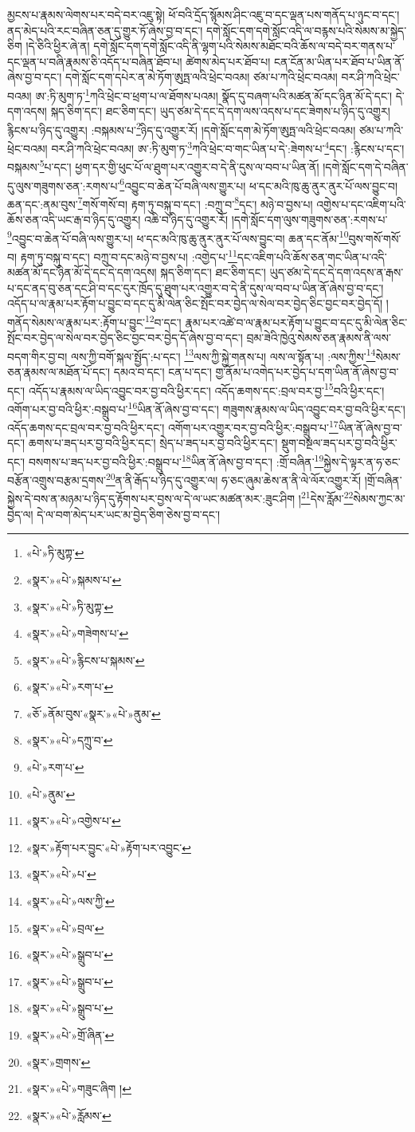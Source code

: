 མྱངས་པ་རྣམས་ལེགས་པར་བདེ་བར་འཇུ་སྟེ། ཕོ་བའི་དྲོད་སྙོམས་ཤིང་འཇུ་བ་དང་ལྡན་པས་གནོད་པ་ཉུང་བ་དང་། ནད་མེད་པའི་རང་བཞིན་ཅན་དུ་གྱུར་ཏོ་ཞེས་བྱ་བ་དང་། དགེ་སློང་དག་དགེ་སློང་འདི་ལ་བརྙས་པའི་སེམས་མ་སྐྱེད་ཅིག །དེ་ཅིའི་ཕྱིར་ཞེ་ན། དགེ་སློང་དག་དགེ་སློང་འདི་ནི་ལྷག་པའི་སེམས་མཐོང་བའི་ཆོས་ལ་བདེ་བར་གནས་པ་དང་ལྡན་པ་བཞི་རྣམས་ཅི་འདོད་པ་བཞིན་ཐོབ་པ། ཚེགས་མེད་པར་ཐོབ་པ། ངན་ངོན་མ་ཡིན་པར་ཐོབ་པ་ཡིན་ནོ་ཞེས་བྱ་བ་དང་། དགེ་སློང་དག་དཔེར་ན་མེ་ཏོག་ཨུཏྤ་ལའི་ཕྲེང་བའམ། ཙམ་པ་ཀའི་ཕྲེང་བའམ། བར་ཤི་ཀའི་ཕྲེང་བའམ། ཨ་:ཏི་མུག་ཏ་\footnote{«པེ་»ཏི་མུཀྟ་}ཀའི་ཕྲེང་བ་ཕྲག་པ་ལ་ཐོགས་པའམ། སྣོད་དུ་བཞག་པའི་མཚན་མོ་དང་ཉིན་མོ་དེ་དང་། དེ་དག་འདས། སྐད་ཅིག་དང་། ཐང་ཅིག་དང་། ཡུད་ཙམ་དེ་དང་དེ་དག་ལས་འདས་པ་དང་ཟེགས་པ་ཉིད་དུ་འགྱུར། རྙིངས་པ་ཉིད་དུ་འགྱུར། :བསྐམས་པ་\footnote{«སྣར་»«པེ་»སྐམས་པ་}ཉིད་དུ་འགྱུར་རོ། །དགེ་སློང་དག་མེ་ཏོག་ཨུཏྤ་ལའི་ཕྲེང་བའམ། ཙམ་པ་ཀའི་ཕྲེང་བའམ། བར་ཤི་ཀའི་ཕྲེང་བའམ། ཨ་:ཏི་མུག་ཏ་\footnote{«སྣར་»«པེ་»ཏི་མུཀྟ་}ཀའི་ཕྲེང་བ་གང་ཡིན་པ་དེ་:ཟེགས་པ་\footnote{«སྣར་»«པེ་»གཟེགས་པ་}དང་། :རྙིངས་པ་དང་། བསྐམས་\footnote{«སྣར་»«པེ་»རྙིངས་པ་སྐམས་}པ་དང་། ཕྱག་དར་གྱི་ཕུང་པོ་ལ་ཐུག་པར་འགྱུར་བ་དེ་ནི་དུས་ལ་བབ་པ་ཡིན་ནོ། །དགེ་སློང་དག་དེ་བཞིན་དུ་ལུས་གཟུགས་ཅན་:རགས་པ་\footnote{«སྣར་»«པེ་»རག་པ་}འབྱུང་བ་ཆེན་པོ་བཞི་ལས་གྱུར་པ། ཕ་དང་མའི་ཁུ་ཆུ་ནུར་ནུར་པོ་ལས་བྱུང་བ། ཆན་དང་:ནམ་བུས་\footnote{«ཅོ་»ནོམ་བུས་«སྣར་»«པེ་»ནུམ་}གསོ་གསོ་བ། རྟག་ཏུ་བསྐུ་བ་དང་། :བཀྲུ་བ་\footnote{«སྣར་»«པེ་»དཀྲུ་བ་}དང་། མཉེ་བ་བྱས་པ། འགྱེས་པ་དང་འཇིག་པའི་ཆོས་ཅན་འདི་ཡང་རྒ་བ་ཉིད་དུ་འགྱུར། འཆི་བ་ཉིད་དུ་འགྱུར་རོ། །དགེ་སློང་དག་ལུས་གཟུགས་ཅན་:རགས་པ་\footnote{«པེ་»རག་པ་}འབྱུང་བ་ཆེན་པོ་བཞི་ལས་གྱུར་པ། ཕ་དང་མའི་ཁུ་ཆུ་ནུར་ནུར་པོ་ལས་བྱུང་བ། ཆན་དང་ནོམ་\footnote{«པེ་»ནུམ་}བུས་གསོ་གསོ་བ། རྟག་ཏུ་བསྐུ་བ་དང་། བཀྲུ་བ་དང་མཉེ་བ་བྱས་པ། :འགྱེད་པ་\footnote{«སྣར་»«པེ་»འགྱེས་པ་}དང་འཇིག་པའི་ཆོས་ཅན་གང་ཡིན་པ་འདི་མཚན་མོ་དང་ཉིན་མོ་དེ་དང་དེ་དག་འདས། སྐད་ཅིག་དང་། ཐང་ཅིག་དང་། ཡུད་ཙམ་དེ་དང་དེ་དག་འདས་ན་རྒས་པ་དང་ནད་བུ་ཅན་དང་ཤི་བ་དང་དུར་ཁྲོད་དུ་ཐུག་པར་འགྱུར་བ་དེ་ནི་དུས་ལ་བབ་པ་ཡིན་ནོ་ཞེས་བྱ་བ་དང་། འདོད་པ་ལ་རྣམ་པར་རྟོག་པ་བྱུང་བ་དང་དུ་མི་ལེན་ཅིང་སྤོང་བར་བྱེད་ལ་སེལ་བར་བྱེད་ཅིང་བྱང་བར་བྱེད་དོ། །གནོད་སེམས་ལ་རྣམ་པར་:རྟོག་པ་བྱུང་\footnote{«སྣར་»རྟོག་པར་བྱུང་«པེ་»རྟོག་པར་འབྱུང་}བ་དང་། རྣམ་པར་འཚེ་བ་ལ་རྣམ་པར་རྟོག་པ་བྱུང་བ་དང་དུ་མི་ལེན་ཅིང་སྤོང་བར་བྱེད་ལ་སེལ་བར་བྱེད་ཅིང་བྱང་བར་བྱེད་དོ་ཞེས་བྱ་བ་དང་། བྲམ་ཟེའི་ཁྱེའུ་སེམས་ཅན་རྣམས་ནི་ལས་བདག་གིར་བྱ་བ། ལས་ཀྱི་བགོ་སྐལ་སྤྱོད་:པ་དང་། \footnote{«སྣར་»«པེ་»པ་}ལས་ཀྱི་སྐྱེ་གནས་པ། ལས་ལ་སྟོན་པ། :ལས་ཀྱིས་\footnote{«སྣར་»«པེ་»ལས་ཀྱི་}སེམས་ཅན་རྣམས་ལ་མཐོན་པོ་དང་། དམའ་བ་དང་། ངན་པ་དང་། གྱ་ནོམ་པ་འགེད་པར་བྱེད་པ་དག་ཡིན་ནོ་ཞེས་བྱ་བ་དང་། འདོད་པ་རྣམས་ལ་ཡིད་འབྱུང་བར་བྱ་བའི་ཕྱིར་དང་། འདོད་ཆགས་དང་:བྲལ་བར་བྱ་\footnote{«སྣར་»«པེ་»བྲལ་}བའི་ཕྱིར་དང་། འགོག་པར་བྱ་བའི་ཕྱིར་:བསྒྲུབ་པ་\footnote{«སྣར་»«པེ་»སྒྲུབ་པ་}ཡིན་ནོ་ཞེས་བྱ་བ་དང་། གཟུགས་རྣམས་ལ་ཡིད་འབྱུང་བར་བྱ་བའི་ཕྱིར་དང་། འདོད་ཆགས་དང་བྲལ་བར་བྱ་བའི་ཕྱིར་དང་། འགོག་པར་འགྱུར་བར་བྱ་བའི་ཕྱིར་:བསྒྲུབ་པ་\footnote{«སྣར་»«པེ་»སྒྲུབ་པ་}ཡིན་ནོ་ཞེས་བྱ་བ་དང་། ཆགས་པ་ཟད་པར་བྱ་བའི་ཕྱིར་དང་། སྲེད་པ་ཟད་པར་བྱ་བའི་ཕྱིར་དང་། སྡུག་བསྔལ་ཟད་པར་བྱ་བའི་ཕྱིར་དང་། བསགས་པ་ཟད་པར་བྱ་བའི་ཕྱིར་:བསྒྲུབ་པ་\footnote{«སྣར་»«པེ་»སྒྲུབ་པ་}ཡིན་ནོ་ཞེས་བྱ་བ་དང་། :གྲོ་བཞིན་\footnote{«སྣར་»«པེ་»གྲོ་ཞིན་}སྐྱེས་དེ་ལྟར་ན་ཧ་ཅང་བརྩོན་འགྲུས་བརྩམ་དྲགས་\footnote{«སྣར་»གྲགས་}ན་ནི་རྒོད་པ་ཉིད་དུ་འགྱུར་ལ། ཧ་ཅང་ཞུམ་ཆེས་ན་ནི་ལེ་ལོར་འགྱུར་རོ། །གྲོ་བཞིན་སྐྱེས་དེ་བས་ན་མཉམ་པ་ཉིད་དུ་རྟོགས་པར་བྱས་ལ་དེ་ལ་ཡང་མཚན་མར་:ཟུང་ཤིག །\footnote{«སྣར་»«པེ་»གཟུང་ཞིག །}དེས་རློམ་\footnote{«སྣར་»«པེ་»རློམས་}སེམས་ཀྱང་མ་བྱེད་ལ། དེ་ལ་བག་མེད་པར་ཡང་མ་བྱེད་ཅིག་ཅེས་བྱ་བ་དང་། 